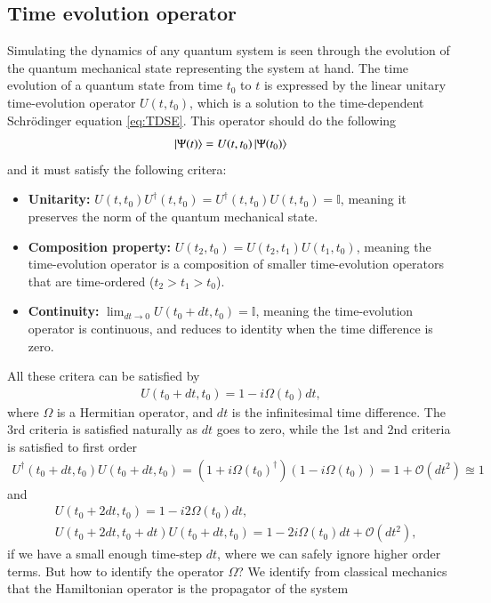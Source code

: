 \documentclass{subfiles}
\begin{document}
\subsection{Time evolution operator}
Simulating the dynamics of any quantum system is seen through the evolution of the quantum mechanical state representing the system at hand. The time evolution of a quantum state from time $t_0$ to $t$ is expressed by the linear unitary time-evolution operator $U(t, t_0)$, which is a solution to the time-dependent Schrödinger equation \eqref{eq:TDSE}\cite{sakurai1986modern, berera2021quantum}. This operator should do the following
\begin{equation}
    \ket{\Psi(t)} = U(t, t_0)\ket{\Psi(t_0)}
\end{equation}
and it must satisfy the following critera:
\begin{itemize}
    \item \textbf{Unitarity:} $U(t, t_0)U^\dagger(t, t_0) = U^\dagger(t, t_0)U(t, t_0) = \mathbb{I}$, meaning it preserves the norm of the quantum mechanical state.
    \item \textbf{Composition property:} $U(t_2, t_0) = U(t_2, t_1)U(t_1, t_0)$, meaning the time-evolution operator is a composition of smaller time-evolution operators that are time-ordered ($t_2>t_1>t_0$).
    \item \textbf{Continuity:} $\lim_{dt\to 0}U(t_0 + dt, t_0) = \mathbb{I}$, meaning the time-evolution operator is continuous, and reduces to identity when the time difference is zero.
\end{itemize}
All these critera can be satisfied by 
\begin{align*}
    U(t_0 + dt, t_0) = 1 - i\Omega(t_0) dt,
\end{align*}
where $\Omega$ is a Hermitian operator, and $dt$ is the infinitesimal time difference. The 3rd criteria is satisfied naturally as $dt$ goes to zero, while the 1st and 2nd criteria is satisfied to first order 
\begin{align*}
    U^\dagger(t_0 + dt, t_0)U(t_0 + dt, t_0) = (1 + i\Omega(t_0)^\dagger)(1 - i\Omega(t_0)) = 1 + \mathcal{O}(dt^2) \approxeq 1
\end{align*}
and
\begin{align*}
    &U(t_0 + 2dt, t_0) = 1 - i2\Omega(t_0)dt, \\
    &U(t_0 + 2dt, t_0 +dt)U(t_0 + dt, t_0) = 1 - 2i\Omega(t_0)dt + \mathcal{O}(dt^2),
\end{align*}
if we have a small enough time-step $dt$, where we can safely ignore higher order terms. But how to identify the operator $\Omega$? We identify from classical mechanics that the Hamiltonian operator is the propagator of the system \cite{sakurai1986modern} 
\end{document}
